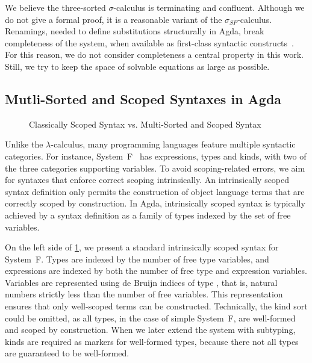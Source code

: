 \documentclass[screen,nonacm]{acmart}
\begin{document}
We believe the three-sorted $σ$-calculus is terminating and confluent. Although
we do not give a formal proof, it is a reasonable variant of the
$σ_{SP}$-calculus. Renamings, needed to define substitutions structurally in
Agda, break completeness of the system, when available as first-class syntactic
constructs~\cite{10.1145/3293880.3294101}. For this reason, we do not consider
completeness a central property in this work. Still, we try to keep the space
of solvable equations as large as possible.

\subsection{Mutli-Sorted and Scoped Syntaxes in Agda}\label{sec:pre-syn}
\begin{figure}[t]
      \centering
      \begin{minipage}[t]{0.48\linewidth}
            \raggedright{}
            \EScoped{}
      \end{minipage}
      \hfill
      \begin{minipage}[t]{0.48\linewidth}
            \raggedright{}
            \EMultiSorted{}
      \end{minipage}
      \caption{Classically Scoped Syntax vs. Multi-Sorted and Scoped Syntax}\label{fig:pre-svm}
\end{figure}

Unlike the $λ$-calculus, many programming languages feature multiple syntactic
categories. For instance, System~F~\cite{girard1972, 10.1007/3-540-06859-7_148}
has expressions, types and kinds, with two of the three categories supporting
variables. To avoid scoping-related errors, we aim for syntaxes that enforce
correct scoping intrinsically. An intrinsically scoped syntax definition only
permits the construction of object language terms that are correctly scoped by
construction. In Agda, intrinsically scoped syntax is typically achieved by a
syntax definition as a family of types indexed by the set of free variables.

On the left side of \cref{fig:pre-svm}, we present a standard intrinsically
scoped syntax for System~F. Types are indexed by the number of free type
variables, and expressions are indexed by both the number of free type and
expression variables. Variables are represented using de Bruijn indices of type
 , that is, natural numbers strictly less than
the number of free variables. This representation ensures that only well-scoped
terms can be constructed. Technically, the kind sort could be omitted, as all
types, in the case of simple System~F, are well-formed and scoped by
construction. When we later extend the system with subtyping, kinds are
required as markers for well-formed types, because there not all types are
guaranteed to be well-formed.
\end{document}
